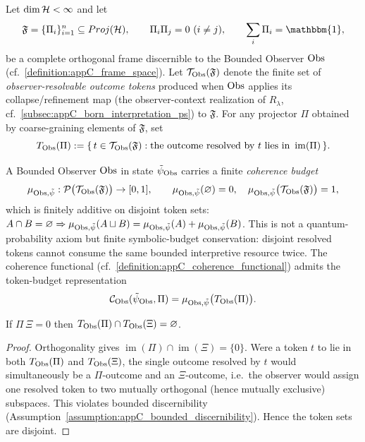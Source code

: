 \begin{definition}
\label{definition:appC_observer_token_space}
Let $\dim\mathcal{H} < \infty$ and let
\[
\mathfrak{F} = \{\Pi_i\}_{i=1}^{n} \subseteq Proj(\Horizon),
\qquad \Pi_i \Pi_j = 0\ (i \neq j),\qquad \sum_i \Pi_i = \mathbbm{1},
\]
be a complete orthogonal frame discernible to the Bounded Observer $\mathrm{Obs}$
(cf.~\ref{definition:appC_frame_space}). Let $\mathcal{T}_{\mathrm{Obs}}(\mathfrak{F})$ denote
the finite set of \emph{observer-resolvable outcome tokens} produced when $\mathrm{Obs}$
applies its collapse/refinement map (the observer-context realization of $R_\lambda$,
cf.~\ref{subsec:appC_born_interpretation_ps}) to $\mathfrak{F}$. For any projector
$\Pi$ obtained by coarse-graining elements of $\mathfrak{F}$, set
\[
T_{\mathrm{Obs}}(\Pi) := \{\, t \in \mathcal{T}_{\mathrm{Obs}}(\mathfrak{F}) :
\text{the outcome resolved by } t \text{ lies in } \operatorname{im}(\Pi) \,\}.
\]
\end{definition}

\begin{definition}
\label{definition:appC_observer_coherence_budget}
A Bounded Observer $\mathrm{Obs}$ in state $\tilde\psi_{\mathrm{Obs}}$ carries a finite
\emph{coherence budget}
\[
\mu_{\mathrm{Obs},\tilde\psi} : \mathcal{P}\big(\mathcal{T}_{\mathrm{Obs}}(\mathfrak{F})\big) \to [0,1],
\qquad
\mu_{\mathrm{Obs},\tilde\psi}(\varnothing) = 0,\quad
\mu_{\mathrm{Obs},\tilde\psi}\big(\mathcal{T}_{\mathrm{Obs}}(\mathfrak{F})\big) = 1,
\]
which is finitely additive on disjoint token sets:
$A \cap B = \varnothing \Rightarrow
\mu_{\mathrm{Obs},\tilde\psi}(A \sqcup B) = \mu_{\mathrm{Obs},\tilde\psi}(A) + \mu_{\mathrm{Obs},\tilde\psi}(B)$.
This is not a quantum-probability axiom but finite symbolic-budget conservation:
disjoint resolved tokens cannot consume the same bounded interpretive resource twice.
The coherence functional (cf.~\ref{definition:appC_coherence_functional}) admits the
token-budget representation
\[
\mathcal{C}_{\mathrm{Obs}}(\tilde\psi_{\mathrm{Obs}}, \Pi) = \mu_{\mathrm{Obs},\tilde\psi}\big(T_{\mathrm{Obs}}(\Pi)\big).
\]
\end{definition}

\begin{lemma}
\label{lemma:appC_orthogonal_token_separation}
If $\Pi\,\Xi = 0$ then $T_{\mathrm{Obs}}(\Pi) \cap T_{\mathrm{Obs}}(\Xi) = \varnothing$.
\end{lemma}

\begin{proof}
\label{proof:appC_orthogonal_token_separation}
Orthogonality gives $\operatorname{im}(\Pi) \cap \operatorname{im}(\Xi) = \{0\}$.
Were a token $t$ to lie in both $T_{\mathrm{Obs}}(\Pi)$ and $T_{\mathrm{Obs}}(\Xi)$, the single outcome
resolved by $t$ would simultaneously be a $\Pi$-outcome and an $\Xi$-outcome,
i.e.\ the observer would assign one resolved token to two mutually orthogonal
(hence mutually exclusive) subspaces. This violates bounded discernibility
(Assumption~\ref{assumption:appC_bounded_discernibility}). Hence the token sets are disjoint.
\end{proof}

